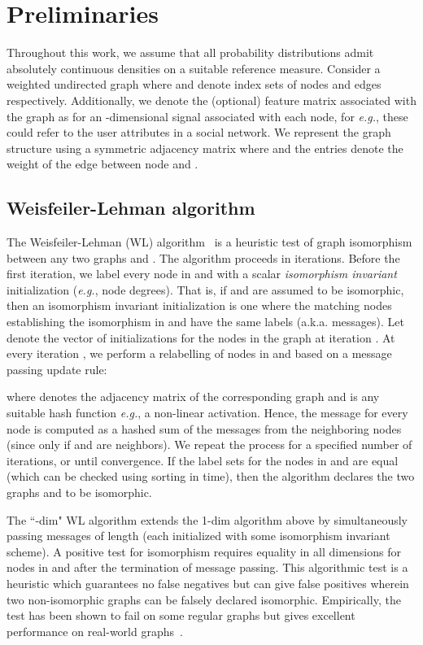 \documentclass{article}
\begin{document}
 \section{Preliminaries}
Throughout this work, we assume that all probability distributions admit absolutely continuous densities on a suitable reference measure. 
Consider a weighted undirected graph  where  and  denote index sets of nodes and edges respectively.
Additionally, we denote the (optional) feature matrix associated with the graph as  for an -dimensional signal associated with each node, for \textit{e.g.}, these could refer to the user attributes in a social network.
We represent the graph structure using a symmetric adjacency matrix  where  and the entries  denote the weight of the edge between node  and .

\subsection{Weisfeiler-Lehman algorithm}
The 
Weisfeiler-Lehman (WL) algorithm~\citep{weisfeiler1968reduction,douglas2011weisfeiler} is a heuristic test of graph isomorphism between any two graphs  and . The algorithm proceeds in iterations. 
Before the first iteration, we label every node in  and  with a scalar \textit{isomorphism invariant} initialization (\textit{e.g.}, node degrees). That is, if  and  are assumed to be isomorphic, then an isomorphism invariant initialization is one where the matching nodes establishing the isomorphism in  and  have the same labels (a.k.a. messages).
Let  denote the vector of initializations 
for the nodes in the graph at iteration .
 At every iteration , we perform a relabelling of nodes in  and  based on a message passing update rule:

where  denotes the adjacency matrix of the corresponding graph and  is any suitable hash function \textit{e.g.}, a non-linear activation. Hence, the message 
for every node is computed as a hashed sum of the messages from the neighboring nodes (since  only if  and  are neighbors). We repeat the process for a specified number of iterations, or until convergence. If the label sets for the nodes in  and  are equal (which can be checked using sorting in  time), then the algorithm declares the two graphs  and  to be isomorphic. 

The ``-dim" WL algorithm extends the 1-dim algorithm above by simultaneously passing messages of length  (each initialized with some isomorphism invariant scheme).
A positive test for isomorphism requires equality in all  dimensions for nodes in  and  after the termination of message passing. 
This algorithmic test is a heuristic which guarantees no false negatives but can give false positives wherein two non-isomorphic graphs can be falsely declared isomorphic. 
Empirically, the test has been shown to fail on some regular graphs but gives excellent performance on real-world graphs~\citep{shervashidze2011weisfeiler}.
\end{document}
